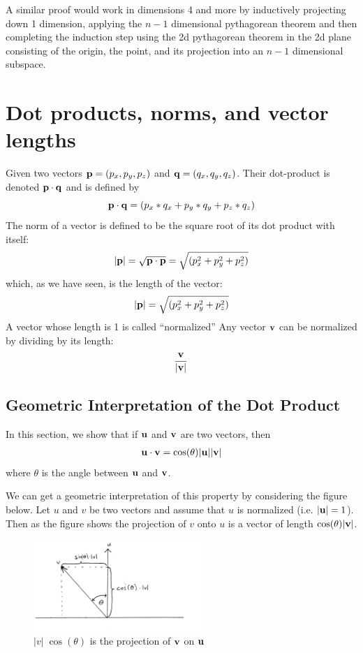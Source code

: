 \documentclass{book}
\newcommand{\vect}[1]{{\bf{ #1}}}
\begin{document}
A similar proof would work in dimensions 4 and more by inductively projecting down 1 dimension,
applying the $n-1$ dimensional pythagorean theorem and then completing the induction step using
the 2d pythagorean theorem in the 2d plane consisting of the origin, the point, and its projection
into an $n-1$ dimensional subspace.

\section{Dot products, norms, and vector lengths}
Given two vectors  ${\vect p} = (p_x, p_y, p_z)$
and ${\vect q} = (q_x, q_y, q_z)$.
Their dot-product is denoted ${\vect p} \cdot {\vect q}$ and is defined by
\[
{\vect p} \cdot {\vect q} = (p_x*q_x + p_y*q_y + p_z*q_z)
\]
The norm of a vector is defined to be the square root of its dot product with itself:
\[
\vert {\vect p} \vert = \sqrt{{\vect p} \cdot {\vect p}} = \sqrt{(p_x^2 + p_y^2 + p_z^2)}
\]
which, as we have seen, is the length of the vector:
\[
\vert {\vect p} \vert = \sqrt{(p_x^2 + p_y^2 + p_z^2)}
\]
A vector whose length is 1 is called ``normalized''
Any vector ${\vect v}$ can be normalized by dividing by its length:
\[
\frac {{\vect v} } {\vert {\vect v} \vert}
\]

\subsection{Geometric Interpretation of the Dot Product}
In this section, we show that if ${\vect u}$ and ${\vect v}$ are two vectors, then
\begin{eqnarray}
{\vect u} \cdot {\vect v} = \cos(\theta) \vert \vect{u} \vert  \vert \vect{v} \vert
\label{eqn:dotprod}
\end{eqnarray}
where $\theta$ is the angle between $\vect{u}$ and $\vect{v}$.

We can get a geometric interpretation of this property by considering the figure below.
Let $u$ and $v$ be two vectors and assume that $u$ is normalized (i.e. $\vert \vect{u}\vert = 1$).
Then as the figure shows the projection of $v$ onto $u$ is a vector of length $\cos(\theta) \vert\vect{v}\vert$.

\begin{figure}[h]
\centering
\includegraphics[width=2.5in]{images/projection.jpg}
\caption{$\vert v \vert \; \cos (\theta)$ is the projection of $\vect{v}$ on $\vect{u}$}
\end{figure}
\end{document}
